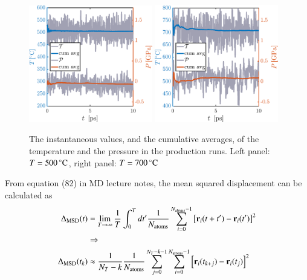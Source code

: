 \begin{figure}[!ht]
\begin{center}
  \includegraphics[width=0.48\textwidth]{../figures/TP-prod-500} 
    \includegraphics[width=0.48\textwidth]{../figures/TP-prod-700} 
  \caption{The instantaneous values, and the cumulative averages, of the temperature and the pressure in the production runs. Left panel: $T=\unit[500]{^\circ C}$,  right panel: $T=\unit[700]{^\circ C}$}
  \label{fig:prod}
\end{center}
\end{figure}

From equation (82) in MD lecture notes, the mean squared displacement can be calculated as
\begin{align}
\Delta_{\rm MSD}(t) &= \lim_{T \rightarrow \infty} \frac{1}{T} \int_0^{T} d t' \frac{1}{N_{\rm atoms}} \sum_{i=0}^{N_{\rm atoms}-1} \left[{\bf r}_i(t+t') - {\bf r}_i(t') \right]^2 \\ &\Rightarrow \nonumber
\\
\Delta_{\rm MSD}(t_k) &\approx
\frac{1}{N_T -k}\frac{1}{N_{\rm atoms}} \sum_{j=0}^{N_T-k-1} \sum_{i=0}^{N_{\rm atoms}-1} \left[{\bf r}_i(t_{k+j}) - {\bf r}_i(t_j) \right]^2 
\label{eq:1}
\end{align}



